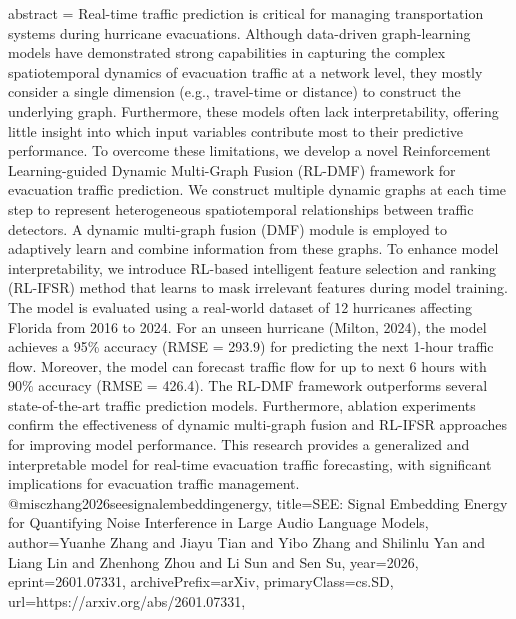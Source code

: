{      abstract = {Real-time traffic prediction is critical for managing transportation systems during hurricane evacuations. Although data-driven graph-learning models have demonstrated strong capabilities in capturing the complex spatiotemporal dynamics of evacuation traffic at a network level, they mostly consider a single dimension (e.g., travel-time or distance) to construct the underlying graph. Furthermore, these models often lack interpretability, offering little insight into which input variables contribute most to their predictive performance. To overcome these limitations, we develop a novel Reinforcement Learning-guided Dynamic Multi-Graph Fusion (RL-DMF) framework for evacuation traffic prediction. We construct multiple dynamic graphs at each time step to represent heterogeneous spatiotemporal relationships between traffic detectors. A dynamic multi-graph fusion (DMF) module is employed to adaptively learn and combine information from these graphs. To enhance model interpretability, we introduce RL-based intelligent feature selection and ranking (RL-IFSR) method that learns to mask irrelevant features during model training. The model is evaluated using a real-world dataset of 12 hurricanes affecting Florida from 2016 to 2024. For an unseen hurricane (Milton, 2024), the model achieves a 95\% accuracy (RMSE = 293.9) for predicting the next 1-hour traffic flow. Moreover, the model can forecast traffic flow for up to next 6 hours with 90\% accuracy (RMSE = 426.4). The RL-DMF framework outperforms several state-of-the-art traffic prediction models. Furthermore, ablation experiments confirm the effectiveness of dynamic multi-graph fusion and RL-IFSR approaches for improving model performance. This research provides a generalized and interpretable model for real-time evacuation traffic forecasting, with significant implications for evacuation traffic management.}
}@misc{zhang2026seesignalembeddingenergy,
      title={SEE: Signal Embedding Energy for Quantifying Noise Interference in Large Audio Language Models}, 
      author={Yuanhe Zhang and Jiayu Tian and Yibo Zhang and Shilinlu Yan and Liang Lin and Zhenhong Zhou and Li Sun and Sen Su},
      year={2026},
      eprint={2601.07331},
      archivePrefix={arXiv},
      primaryClass={cs.SD},
      url={https://arxiv.org/abs/2601.07331},
}
